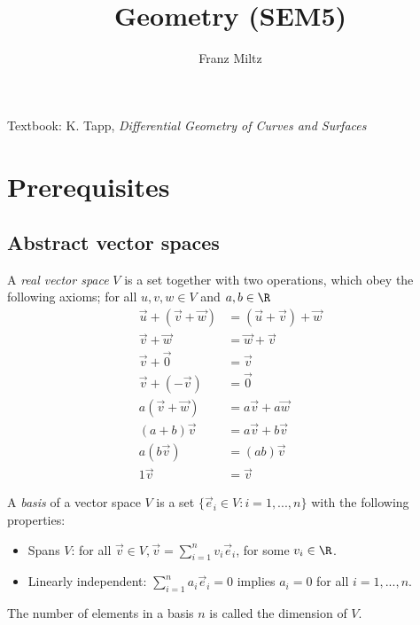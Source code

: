\documentclass{article}
\begin{document}
\title{Geometry (SEM5)}
\author{Franz Miltz}
\maketitle
\noindent Textbook: K. Tapp, \emph{Differential Geometry of Curves and Surfaces}
\tableofcontents
\pagebreak

\section{Prerequisites}

\subsection{Abstract vector spaces}

\begin{definition}[Notes 2.1]
    A \emph{real vector space} $V$ is a set together with two operations, which obey the following
    axioms; for all $u,v,w\in V$ and $a,b\in\R$
    \begin{align*}
        \vec u + (\vec v + \vec w) &= (\vec u + \vec v) + \vec w\\
        \vec v + \vec w &= \vec w + \vec v \\
        \vec v + \vec 0 &= \vec v \\
        \vec v + (-\vec v) &= \vec 0 \\
        a(\vec v + \vec w) &= a\vec v + a\vec w \\
        (a+b)\vec v &= a\vec v + b\vec v \\
        a(b\vec v) &= (ab)\vec v\\
        1\vec v &= \vec v
    \end{align*}
\end{definition}

\begin{definition}[Notes 2.3]
    A \emph{basis} of a vector space $V$ is a set $\{\vec e_i \in V : i = 1, ..., n\}$
    with the following properties:
    \begin{itemize}
        \item Spans $V$: for all $\vec v\in V, \vec v = \sum_{i=1}^n v_i \vec e_i$, for some $v_i\in\R$.
        \item Linearly independent: $\sum_{i=1}^n a_i\vec e_i = 0$ implies $a_i = 0$ for all $i=1,...,n$.
    \end{itemize}
    The number of elements in a basis $n$ is called the dimension of $V$.
\end{definition}
\end{document}
